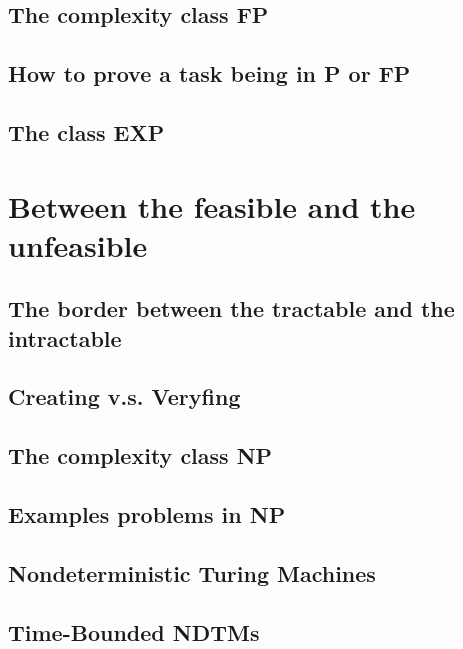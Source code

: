\documentclass[12pt,a4paper,oneside]{book}
\begin{document}
\section{The complexity class FP}

\label{s_3_5}

\section{How to prove a task being in P or FP}

\label{s_3_6}

\section{The class EXP}

\label{s_3_7}

\chapter{Between the feasible and the unfeasible}

\label{c_4}

\section{The border between the tractable and the intractable}

\label{s_4_1}

\section{Creating v.s. Veryfing}

\label{s_4_2}

\section{The complexity class NP}

\label{s_4_3}

\section{Examples problems in NP}

\label{s_4_4}

\section{Nondeterministic Turing Machines}

\label{s_4_5}

\section{Time-Bounded NDTMs}

\label{s_4_6}
\end{document}
